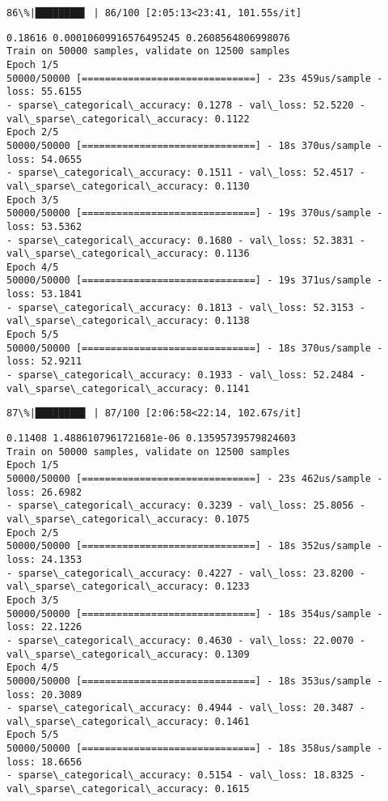 \documentclass[11pt]{article}
\begin{document}
    \begin{Verbatim}[commandchars=\\\{\}]
 86\%|████████▌ | 86/100 [2:05:13<23:41, 101.55s/it]
    \end{Verbatim}

    \begin{Verbatim}[commandchars=\\\{\}]
0.18616 0.00010609916576495245 0.2608564806998076
Train on 50000 samples, validate on 12500 samples
Epoch 1/5
50000/50000 [==============================] - 23s 459us/sample - loss: 55.6155
- sparse\_categorical\_accuracy: 0.1278 - val\_loss: 52.5220 -
val\_sparse\_categorical\_accuracy: 0.1122
Epoch 2/5
50000/50000 [==============================] - 18s 370us/sample - loss: 54.0655
- sparse\_categorical\_accuracy: 0.1511 - val\_loss: 52.4517 -
val\_sparse\_categorical\_accuracy: 0.1130
Epoch 3/5
50000/50000 [==============================] - 19s 370us/sample - loss: 53.5362
- sparse\_categorical\_accuracy: 0.1680 - val\_loss: 52.3831 -
val\_sparse\_categorical\_accuracy: 0.1136
Epoch 4/5
50000/50000 [==============================] - 19s 371us/sample - loss: 53.1841
- sparse\_categorical\_accuracy: 0.1813 - val\_loss: 52.3153 -
val\_sparse\_categorical\_accuracy: 0.1138
Epoch 5/5
50000/50000 [==============================] - 18s 370us/sample - loss: 52.9211
- sparse\_categorical\_accuracy: 0.1933 - val\_loss: 52.2484 -
val\_sparse\_categorical\_accuracy: 0.1141
    \end{Verbatim}

    \begin{Verbatim}[commandchars=\\\{\}]
 87\%|████████▋ | 87/100 [2:06:58<22:14, 102.67s/it]
    \end{Verbatim}

    \begin{Verbatim}[commandchars=\\\{\}]
0.11408 1.4886107961721681e-06 0.13595739579824603
Train on 50000 samples, validate on 12500 samples
Epoch 1/5
50000/50000 [==============================] - 23s 462us/sample - loss: 26.6982
- sparse\_categorical\_accuracy: 0.3239 - val\_loss: 25.8056 -
val\_sparse\_categorical\_accuracy: 0.1075
Epoch 2/5
50000/50000 [==============================] - 18s 352us/sample - loss: 24.1353
- sparse\_categorical\_accuracy: 0.4227 - val\_loss: 23.8200 -
val\_sparse\_categorical\_accuracy: 0.1233
Epoch 3/5
50000/50000 [==============================] - 18s 354us/sample - loss: 22.1226
- sparse\_categorical\_accuracy: 0.4630 - val\_loss: 22.0070 -
val\_sparse\_categorical\_accuracy: 0.1309
Epoch 4/5
50000/50000 [==============================] - 18s 353us/sample - loss: 20.3089
- sparse\_categorical\_accuracy: 0.4944 - val\_loss: 20.3487 -
val\_sparse\_categorical\_accuracy: 0.1461
Epoch 5/5
50000/50000 [==============================] - 18s 358us/sample - loss: 18.6656
- sparse\_categorical\_accuracy: 0.5154 - val\_loss: 18.8325 -
val\_sparse\_categorical\_accuracy: 0.1615
    \end{Verbatim}
\end{document}
